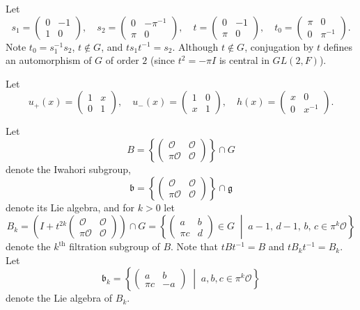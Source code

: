 \documentclass[12pt,letterpaper,reqno]{amsart}
\let\cal\mathcal
\let\frak\mathfrak
\theoremstyle{definition}
\theoremstyle{remark}
\numberwithin{equation}{section}
\begin{document}
Let
\[
s_1=
\begin{pmatrix}
0 & -1\\
1 & 0
\end{pmatrix},\quad
s_2=
\begin{pmatrix}
0 & -\pi^{-1}\\
\pi & 0
\end{pmatrix},\quad
t=
\begin{pmatrix}
0 & -1\\
\pi & 0
\end{pmatrix},\quad
t_0=
\begin{pmatrix}
\pi & 0 \\
0 & \pi^{-1}
\end{pmatrix}.
\]
Note $t_0=s_1^{-1}s_2$, $t\notin G$, and $ts_1t^{-1}=s_2$. Although
$t\notin G$, conjugation by $t$ defines an automorphism of $G$ of order $2$
(since $t^2=-\pi I$ is central in $GL(2,F)$).

Let
\[
u_+(x)=
\begin{pmatrix}
1 & x\\
0 & 1
\end{pmatrix},\quad
u_-(x)=
\begin{pmatrix}
1 & 0\\
x & 1
\end{pmatrix},\quad
h(x)=
\begin{pmatrix}
x & 0\\
0 & x^{-1}
\end{pmatrix}.
\]

Let
\[
B=\left\{
\begin{pmatrix}
{\cal O} & {\cal O}\\
\pi {\cal O} & {\cal O}
\end{pmatrix}\right\}\cap G
\]
denote the Iwahori subgroup,
\[
{\frak{b}}=\left\{
\begin{pmatrix}
{\cal O} & {\cal O}\\
\pi {\cal O} & {\cal O}
\end{pmatrix}\right\}\cap \frak{g}
\]
denote its Lie algebra, and for $k>0$ let
\[
B_k=\left(I+t^{2k}
\begin{pmatrix}
{\cal O} & {\cal O}\\
\pi {\cal O} & {\cal O}
\end{pmatrix}\right)\cap G
=\left\{
\begin{pmatrix}
a & b\\
\pi c & d
\end{pmatrix}\in G \;\middle|\;
a-1,\, d-1,\, b,\, c \in \pi^k{\cal O}
\right\}
\]
denote the $k^{\text{th}}$ filtration subgroup of $B$. Note that
$t B t^{-1}=B$ and $t B_k t^{-1}=B_k$. Let
\[
{\frak{b}}_k
=\left\{
\begin{pmatrix}
a & b\\
\pi c & -a
\end{pmatrix}
\;\middle|\;
a,b,c\in \pi^{k}{\cal O}\right\}
\]
denote the Lie algebra of $B_k$.
\end{document}
